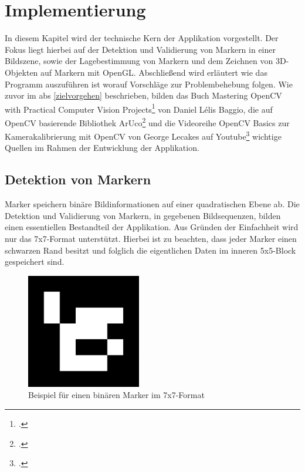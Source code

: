
\section{Implementierung}
In diesem Kapitel wird der technische Kern der Applikation vorgestellt. Der Fokus liegt hierbei auf der Detektion und Validierung von Markern in einer Bildszene, sowie der Lagebestimmung von Markern und dem Zeichnen von 3D-Objekten auf Markern mit OpenGL. Abschließend wird erläutert wie das Programm auszuführen ist worauf Vorschläge zur Problembehebung folgen. Wie zuvor im \acs{abs} \ref{zielvorgehen} beschrieben, bilden das Buch \glqq Mastering OpenCV with Practical Computer Vision Projects\grqq \footcite{Baggioonline} von Daniel Lélis Baggio, die auf OpenCV basierende Bibliothek \glqq ArUco\grqq \footcite{arucoonline} und die Videoreihe \glqq OpenCV Basics\grqq{} zur Kamerakalibrierung mit OpenCV von George Lecakes auf Youtube\footcite{LecakesOpenCV} wichtige Quellen im Rahmen der Entwicklung der Applikation.

\subsection{Detektion von Markern}\label{ssec:detectionmarker}
Marker speichern binäre Bildinformationen auf einer quadratischen Ebene ab. Die Detektion und Validierung von Markern, in gegebenen Bildsequenzen, bilden einen essentiellen Bestandteil der Applikation. Aus Gründen der Einfachheit wird nur das 7x7-Format unterstützt. Hierbei ist zu beachten, dass jeder Marker einen schwarzen Rand besitzt und folglich die eigentlichen Daten im inneren 5x5-Block gespeichert sind.

\begin{figure}[H]
\centering
\includegraphics[width=5cm]{Bilder/Implementierung/marker1.jpg}
\caption{Beispiel für einen binären Marker im 7x7-Format}
\label{fig:MarkerExample}
\end{figure}

